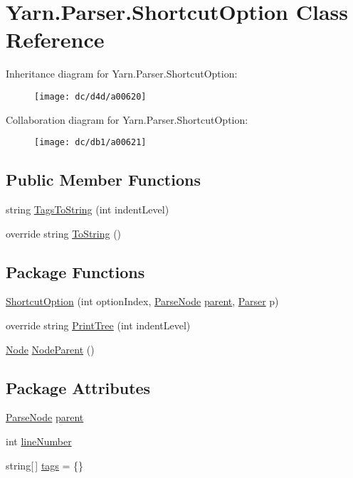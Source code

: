 \hypertarget{a00133}{\section{Yarn.\-Parser.\-Shortcut\-Option Class Reference}
\label{a00133}
}


Inheritance diagram for Yarn.\-Parser.\-Shortcut\-Option\-:
\nopagebreak
\begin{figure}[H]
\begin{center}
\leavevmode
\texttt{[image: dc/d4d/a00620]}
\end{center}
\end{figure}


Collaboration diagram for Yarn.\-Parser.\-Shortcut\-Option\-:
\nopagebreak
\begin{figure}[H]
\begin{center}
\leavevmode
\texttt{[image: dc/db1/a00621]}
\end{center}
\end{figure}
\subsection*{Public Member Functions}
\begin{DoxyCompactItemize}
\item 
string \hyperlink{a00120_a054f36c80d5eeacd569a8859f599af67}{Tags\-To\-String} (int indent\-Level)
\item 
override string \hyperlink{a00120_a18c67cb16090d0889bb9d6c8c6c565f8}{To\-String} ()
\end{DoxyCompactItemize}
\subsection*{Package Functions}
\begin{DoxyCompactItemize}
\item 
\hyperlink{a00133_a2c80b137d65f31b24533987233074605}{Shortcut\-Option} (int option\-Index, \hyperlink{a00120}{Parse\-Node} \hyperlink{a00120_af313a82103fcc2ff5a177dbb06b92f7b}{parent}, \hyperlink{a00121}{Parser} p)
\item 
override string \hyperlink{a00133_a529a2ef1aa6d7226db4ea7f3ea92b8c2}{Print\-Tree} (int indent\-Level)
\item 
\hyperlink{a00110}{Node} \hyperlink{a00120_a580e520a29444fc23ac3660cbe514a09}{Node\-Parent} ()
\end{DoxyCompactItemize}
\subsection*{Package Attributes}
\begin{DoxyCompactItemize}
\item 
\hyperlink{a00120}{Parse\-Node} \hyperlink{a00120_af313a82103fcc2ff5a177dbb06b92f7b}{parent}
\item 
int \hyperlink{a00120_a18b493382de0fde5b4299c1bd2250075}{line\-Number}
\item 
string\mbox{[}$\,$\mbox{]} \hyperlink{a00120_a58b3a15788fd2d4127d73619dc6d04ae}{tags} = \{\}
\end{DoxyCompactItemize}
